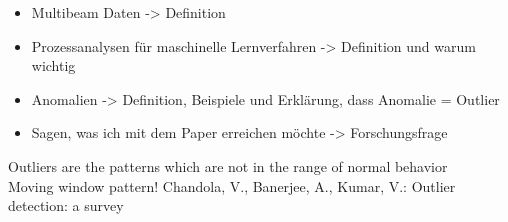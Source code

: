 

\begin{itemize}
	\item Multibeam Daten -> Definition
	\item Prozessanalysen für maschinelle Lernverfahren -> Definition und warum wichtig
	\item Anomalien -> Definition, Beispiele und Erklärung, dass Anomalie = Outlier
	\item Sagen, was ich mit dem Paper erreichen möchte -> Forschungsfrage
\end{itemize}

Outliers are the patterns which are not in the range of normal behavior \cite{vinuthaDetectionOutliersUsing2018} 
\\
Moving window pattern!
Chandola, V., Banerjee, A., Kumar, V.: Outlier detection: a survey
